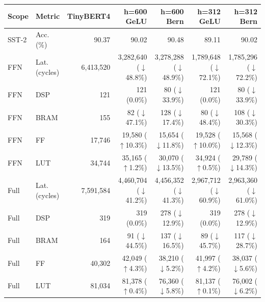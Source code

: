 \begin{tabular}{llrrrrr}
\toprule
Scope & Metric & TinyBERT4 & h=600 GeLU & h=600 Bern & h=312 GeLU & h=312 Bern \\
\midrule
SST-2 & Acc. (\%) & 90.37 & 90.02 & 90.48 & 89.11 & 90.02 \\
\midrule
FFN & Lat. (cycles) & 6,413,520 & 3,282,640 ($\downarrow$48.8\%) & 3,278,288 ($\downarrow$48.9\%) & 1,789,648 ($\downarrow$72.1\%) & 1,785,296 ($\downarrow$72.2\%) \\
FFN & DSP & 121 & 121 (0.0\%) & 80 ($\downarrow$33.9\%) & 121 (0.0\%) & 80 ($\downarrow$33.9\%) \\
FFN & BRAM & 155 & 82 ($\downarrow$47.1\%) & 128 ($\downarrow$17.4\%) & 80 ($\downarrow$48.4\%) & 108 ($\downarrow$30.3\%) \\
FFN & FF & 17,746 & 19,580 ($\uparrow$10.3\%) & 15,654 ($\downarrow$11.8\%) & 19,528 ($\uparrow$10.0\%) & 15,568 ($\downarrow$12.3\%) \\
FFN & LUT & 34,744 & 35,165 ($\uparrow$1.2\%) & 30,070 ($\downarrow$13.5\%) & 34,924 ($\uparrow$0.5\%) & 29,789 ($\downarrow$14.3\%) \\
\midrule
Full & Lat. (cycles) & 7,591,584 & 4,460,704 ($\downarrow$41.2\%) & 4,456,352 ($\downarrow$41.3\%) & 2,967,712 ($\downarrow$60.9\%) & 2,963,360 ($\downarrow$61.0\%) \\
Full & DSP & 319 & 319 (0.0\%) & 278 ($\downarrow$12.9\%) & 319 (0.0\%) & 278 ($\downarrow$12.9\%) \\
Full & BRAM & 164 & 91 ($\downarrow$44.5\%) & 137 ($\downarrow$16.5\%) & 89 ($\downarrow$45.7\%) & 117 ($\downarrow$28.7\%) \\
Full & FF & 40,302 & 42,049 ($\uparrow$4.3\%) & 38,210 ($\downarrow$5.2\%) & 41,997 ($\uparrow$4.2\%) & 38,037 ($\downarrow$5.6\%) \\
Full & LUT & 81,034 & 81,378 ($\uparrow$0.4\%) & 76,360 ($\downarrow$5.8\%) & 81,137 ($\uparrow$0.1\%) & 76,002 ($\downarrow$6.2\%) \\
\bottomrule
\end{tabular}
